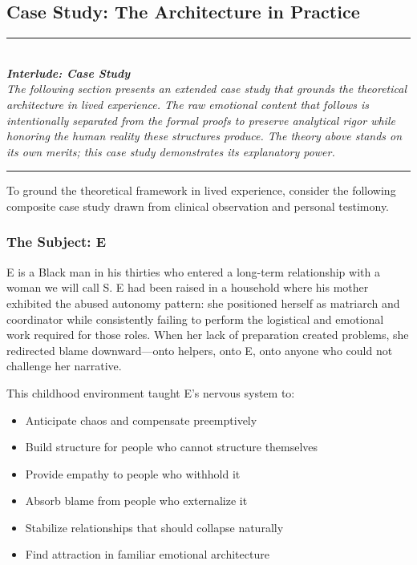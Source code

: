\documentclass[12pt, letterpaper]{article}
\begin{document}
\subsection{Case Study: The Architecture in Practice}

\begin{center}
\rule{0.5\textwidth}{0.4pt}\\[0.5em]
\textit{\textbf{Interlude: Case Study}}\\[0.3em]
\textit{The following section presents an extended case study that grounds the theoretical architecture in lived experience. The raw emotional content that follows is intentionally separated from the formal proofs to preserve analytical rigor while honoring the human reality these structures produce. The theory above stands on its own merits; this case study demonstrates its explanatory power.}\\[0.5em]
\rule{0.5\textwidth}{0.4pt}
\end{center}

\vspace{1em}

To ground the theoretical framework in lived experience, consider the following composite case study drawn from clinical observation and personal testimony.

\subsubsection{The Subject: E}

E is a Black man in his thirties who entered a long-term relationship with a woman we will call S. E had been raised in a household where his mother exhibited the abused autonomy pattern: she positioned herself as matriarch and coordinator while consistently failing to perform the logistical and emotional work required for those roles. When her lack of preparation created problems, she redirected blame downward---onto helpers, onto E, onto anyone who could not challenge her narrative.

This childhood environment taught E's nervous system to:
\begin{itemize}
    \item Anticipate chaos and compensate preemptively
    \item Build structure for people who cannot structure themselves
    \item Provide empathy to people who withhold it
    \item Absorb blame from people who externalize it
    \item Stabilize relationships that should collapse naturally
    \item Find attraction in familiar emotional architecture
\end{itemize}
\end{document}
